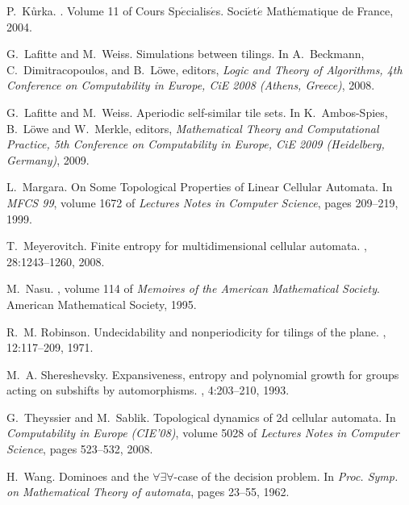 \documentclass{llncs}
\begin{document}
\begin{thebibliography}{10}
P.~K{\r{u}}rka.
.
\newblock Volume 11 of Cours Sp$\acute{e}$cialis$\acute{e}$s.
  Soci$\acute{e}$t$\acute{e}$ Math$\acute{e}$matique de France, 2004.

G.~Lafitte and M.~Weiss.
\newblock Simulations between tilings.
\newblock In A.~Beckmann, C.~Dimitracopoulos, and B.~L{\"o}we, editors, {\em
  Logic and Theory of Algorithms, 4th Conference on Computability in Europe,
  CiE 2008 (Athens, Greece)}, 2008.

G.~Lafitte and M.~Weiss.
\newblock Aperiodic self-similar tile sets.
\newblock In K.~Ambos-Spies, B.~L{\"o}we and W.~Merkle, editors, {\em
Mathematical Theory and Computational Practice, 5th Conference
on Computability in Europe, CiE 2009 (Heidelberg, Germany)}, 2009.

L.~Margara.
\newblock On Some Topological Properties of Linear Cellular Automata.
\newblock In {\em MFCS 99}, volume 1672 of {\em
  Lectures Notes in Computer Science}, pages 209--219, 1999.

T.~Meyerovitch.
\newblock Finite entropy for multidimensional cellular automata.
, 28:1243--1260, 2008.

M.~Nasu.
, volume 114 of {\em Memoires of the {A}merican {M}athematical
  {S}ociety}.
\newblock American Mathematical Society, 1995.

R.~M. Robinson.
\newblock Undecidability and nonperiodicity for tilings of the plane.
, 12:117--209, 1971.

M.~A. Shereshevsky.
\newblock Expansiveness, entropy and polynomial growth for groups acting on
  subshifts by automorphisms.
, 4:203--210, 1993.

G.~Theyssier and M.~Sablik.
\newblock Topological dynamics of 2d cellular automata.
\newblock In {\em Computability in Europe (CIE'08)}, volume 5028 of {\em
  Lectures Notes in Computer Science}, pages 523--532, 2008.

H.~Wang.
\newblock Dominoes and the {$\forall\exists\forall$}-case of the decision
  problem.
\newblock In {\em Proc. Symp. on Mathematical Theory of automata}, pages
  23--55, 1962.

\end{thebibliography}
\end{document}
